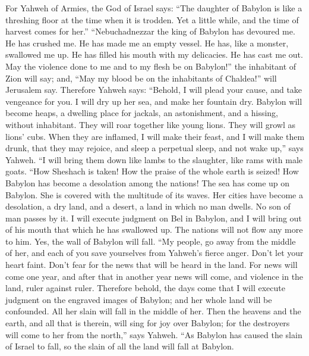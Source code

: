 For Yahweh of Armies, the God of Israel says: ``The
daughter of Babylon is like a threshing floor at the time when it is
trodden. Yet a little while, and the time of harvest comes for her.''
 ``Nebuchadnezzar the king of Babylon has devoured me. He
has crushed me. He has made me an empty vessel. He has, like a monster,
swallowed me up. He has filled his mouth with my delicacies. He has cast
me out.  May the violence done to me and to my flesh be on
Babylon!'' the inhabitant of Zion will say; and, ``May my blood be on
the inhabitants of Chaldea!'' will Jerusalem say. 
Therefore Yahweh says: ``Behold, I will plead your cause, and take
vengeance for you. I will dry up her sea, and make her fountain dry.
 Babylon will become heaps, a dwelling place for jackals,
an astonishment, and a hissing, without inhabitant.  They
will roar together like young lions. They will growl as lions' cubs.
 When they are inflamed, I will make their feast, and I
will make them drunk, that they may rejoice, and sleep a perpetual
sleep, and not wake up,'' says Yahweh.  ``I will bring them
down like lambs to the slaughter, like rams with male goats.
 ``How Sheshach is taken! How the praise of the whole earth
is seized! How Babylon has become a desolation among the nations!
 The sea has come up on Babylon. She is covered with the
multitude of its waves.  Her cities have become a
desolation, a dry land, and a desert, a land in which no man dwells. No
son of man passes by it.  I will execute judgment on Bel in
Babylon, and I will bring out of his mouth that which he has swallowed
up. The nations will not flow any more to him. Yes, the wall of Babylon
will fall.  ``My people, go away from the middle of her,
and each of you save yourselves from Yahweh's fierce anger.
 Don't let your heart faint. Don't fear for the news that
will be heard in the land. For news will come one year, and after that
in another year news will come, and violence in the land, ruler against
ruler.  Therefore behold, the days come that I will execute
judgment on the engraved images of Babylon; and her whole land will be
confounded. All her slain will fall in the middle of her. 
Then the heavens and the earth, and all that is therein, will sing for
joy over Babylon; for the destroyers will come to her from the north,''
says Yahweh.  ``As Babylon has caused the slain of Israel
to fall, so the slain of all the land will fall at Babylon.

